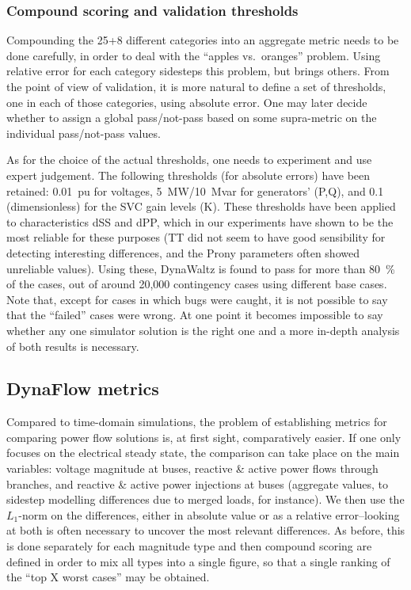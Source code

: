\documentclass[conference]{IEEEtran}
\begin{document}
\subsubsection{Compound scoring and validation thresholds}

Compounding the 25+8 different categories into an aggregate metric needs to be
done carefully, in order to deal with the ``apples vs.\ oranges'' problem. Using
relative error for each category sidesteps this problem, but brings others.
From the point of view of validation, it is more natural to define a set of
thresholds, one in each of those categories, using absolute error. One may later
decide whether to assign a global pass/not-pass based on some supra-metric on
the individual pass/not-pass values.


As for the choice of the actual thresholds, one needs to experiment and use
expert judgement. The following thresholds (for absolute errors) have been
retained: \SI{0.01}{pu} for voltages, \SI{5}{MW}/\SI{10}{Mvar} for generators'
(P,Q), and 0.1 (dimensionless) for the SVC gain levels (K). These thresholds
have been applied to characteristics dSS and dPP, which in our experiments have
shown to be the most reliable for these purposes (TT did not seem to have good
sensibility for detecting interesting differences, and the Prony parameters
often showed unreliable values).  Using these, DynaWaltz is found to pass for
more than \SI{80}{\%} of the cases, out of around 20,000 contingency cases using
different base cases.  Note that, except for cases in which bugs were caught, it
is not possible to say that the ``failed'' cases were wrong.  At one point it
becomes impossible to say whether any one simulator solution is the right one
and a more in-depth analysis of both results is necessary.



\subsection{DynaFlow metrics}

Compared to time-domain simulations, the problem of establishing metrics for
comparing power flow solutions is, at first sight, comparatively easier. If one
only focuses on the electrical steady state, the comparison can take place on
the main variables: voltage magnitude at buses, reactive \& active power flows
through branches, and reactive \& active power injections at buses (aggregate
values, to sidestep modelling differences due to merged loads, for instance). We
then use the $L_1$-norm on the differences, either in absolute value or as a
relative error--looking at both is often necessary to uncover the most relevant
differences. As before, this is done separately for each magnitude type and then
compound scoring are defined in order to mix all types into a single figure, so
that a single ranking of the ``top X worst cases'' may be obtained.
\end{document}
